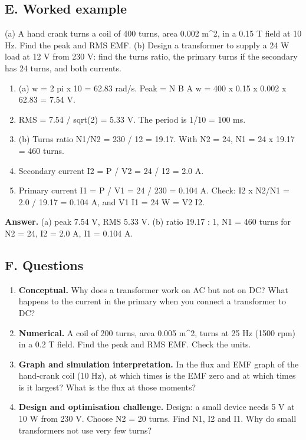 \documentclass[11pt,a4paper]{article}
\begin{document}
\subsection*{E. Worked example}
(a) A hand crank turns a coil of 400 turns, area 0.002 m\textasciicircum{}2, in a 0.15 T field at 10 Hz. Find the peak and RMS EMF. (b) Design a transformer to supply a 24 W load at 12 V from 230 V: find the turns ratio, the primary turns if the secondary has 24 turns, and both currents.
\begin{enumerate}[nosep]
\item (a) w = 2 pi x 10 = 62.83 rad/s. Peak = N B A w = 400 x 0.15 x 0.002 x 62.83 = 7.54 V.
\item RMS = 7.54 / sqrt(2) = 5.33 V. The period is 1/10 = 100 ms.
\item (b) Turns ratio N1/N2 = 230 / 12 = 19.17. With N2 = 24, N1 = 24 x 19.17 = 460 turns.
\item Secondary current I2 = P / V2 = 24 / 12 = 2.0 A.
\item Primary current I1 = P / V1 = 24 / 230 = 0.104 A. Check: I2 x N2/N1 = 2.0 / 19.17 = 0.104 A, and V1 I1 = 24 W = V2 I2.
\end{enumerate}
\textbf{Answer.} (a) peak 7.54 V, RMS 5.33 V. (b) ratio 19.17 : 1, N1 = 460 turns for N2 = 24, I2 = 2.0 A, I1 = 0.104 A.

\subsection*{F. Questions}
\begin{enumerate}[nosep]
\item \textbf{Conceptual.} Why does a transformer work on AC but not on DC? What happens to the current in the primary when you connect a transformer to DC?
\item \textbf{Numerical.} A coil of 200 turns, area 0.005 m\textasciicircum{}2, turns at 25 Hz (1500 rpm) in a 0.2 T field. Find the peak and RMS EMF. Check the units.
\item \textbf{Graph and simulation interpretation.} In the flux and EMF graph of the hand-crank coil (10 Hz), at which times is the EMF zero and at which times is it largest? What is the flux at those moments?
\item \textbf{Design and optimisation challenge.} Design: a small device needs 5 V at 10 W from 230 V. Choose N2 = 20 turns. Find N1, I2 and I1. Why do small transformers not use very few turns?
\end{enumerate}
\end{document}

